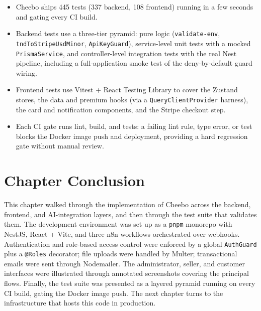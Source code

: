 \documentclass[12pt, a4paper, oneside]{report}
\newenvironment{keytakeaways}{%
  \par\bigskip
  \begin{mdframed}[
    backgroundcolor=cheebolightgray,
    linecolor=cheeboblue,
    linewidth=3pt,
    topline=false,
    bottomline=false,
    rightline=false,
    innerleftmargin=14pt,
    innerrightmargin=14pt,
    innertopmargin=10pt,
    innerbottommargin=10pt
  ]
  \noindent{\bfseries\color{cheeboblue}\large Key Takeaways}\par
  \vspace{4pt}
  \small
}{%
  \end{mdframed}
}
\begin{document}
\begin{keytakeaways}
\begin{itemize}[leftmargin=*,itemsep=2pt]
  \item Cheebo ships 445 tests (337 backend, 108 frontend) running in
        a few seconds and gating every CI build.
  \item Backend tests use a three-tier pyramid: pure logic
        (\texttt{validate-env}, \texttt{tndToStripeUsdMinor},
        \texttt{ApiKeyGuard}), service-level
        unit tests with a mocked \texttt{PrismaService}, and
        controller-level integration tests with the real Nest
        pipeline, including a full-application smoke test of the
        deny-by-default guard wiring.
  \item Frontend tests use Vitest + React Testing Library to cover
        the Zustand stores, the data and premium hooks (via a
        \texttt{QueryClientProvider} harness), the card and
        notification components, and the Stripe checkout step.
  \item Each CI gate runs lint, build, and tests: a failing lint
        rule, type error, or test blocks the Docker image push and
        deployment, providing a hard regression gate without manual
        review.
\end{itemize}
\end{keytakeaways}

\section*{Chapter Conclusion}

This chapter walked through the implementation of Cheebo across the
backend, frontend, and AI-integration layers, and then through the
test suite that validates them. The development environment was set
up as a \texttt{pnpm} monorepo with NestJS, React + Vite, and three
n8n workflows orchestrated over webhooks. Authentication and
role-based access control were enforced by a global \texttt{AuthGuard}
plus a \texttt{@Roles} decorator; file uploads were handled by Multer;
transactional emails were sent through Nodemailer. The administrator,
seller, and customer interfaces were illustrated through annotated
screenshots covering the principal flows. Finally, the test suite
was presented as a layered pyramid running on every CI build,
gating the Docker image push. The next chapter turns to the
infrastructure that hosts this code in production.
\end{document}
